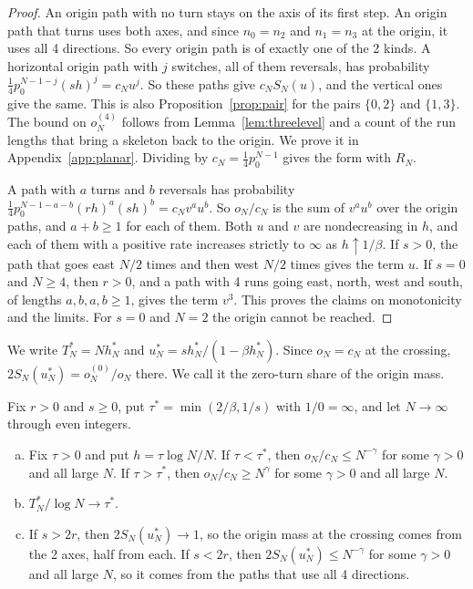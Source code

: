 \begin{proof}
An origin path with no turn stays on the axis of its first step. An origin path that turns uses both
axes, and since $n_0=n_2$ and $n_1=n_3$ at the origin, it uses all 4 directions. So every origin
path is of exactly one of the 2 kinds. A horizontal origin
path with $j$ switches, all of them reversals, has probability $\frac14p_0^{N-1-j}(sh)^j=c_Nu^j$.
So these paths give $c_NS_N(u)$, and the vertical ones give the same. This is also
Proposition~\ref{prop:pair} for the pairs $\{0,2\}$ and $\{1,3\}$. The bound on $o^{(4)}_N$ follows
from Lemma~\ref{lem:threelevel} and a count of the run lengths that bring a skeleton back to the
origin. We prove it in Appendix~\ref{app:planar}. Dividing by $c_N=\frac14p_0^{N-1}$ gives the form
with $R_N$.

A path with $a$ turns and $b$ reversals has probability $\frac14p_0^{N-1-a-b}(rh)^a(sh)^b=c_Nv^au^b$.
So $o_N/c_N$ is the sum of $v^au^b$ over the origin paths, and $a+b\ge1$ for each of them. Both $u$
and $v$ are nondecreasing in $h$, and each of them with a positive rate increases strictly to
$\infty$ as $h\uparrow1/\beta$. If $s>0$, the path that goes east $N/2$ times and then west $N/2$
times gives the term $u$. If $s=0$ and $N\ge4$, then $r>0$, and a path with 4 runs going east,
north, west and south, of lengths $a,b,a,b\ge1$, gives the term $v^3$. This proves the claims on
monotonicity and the limits. For $s=0$ and $N=2$ the origin cannot be reached.
\end{proof}

We write $T^*_N=Nh^*_N$ and $u^*_N=sh^*_N/(1-\beta h^*_N)$. Since $o_N=c_N$ at the crossing,
$2S_N(u^*_N)=o^{(0)}_N/o_N$ there. We call it the zero-turn share of the origin mass.

\begin{theorem}\label{thm:planar-first}
Fix $r>0$ and $s\ge0$, put $\tau^*=\min(2/\beta,1/s)$ with $1/0=\infty$, and let $N\to\infty$
through even integers.
\begin{enumerate}[(a)]
\item Fix $\tau>0$ and put $h=\tau\log N/N$. If $\tau<\tau^*$, then $o_N/c_N\le N^{-\gamma}$ for
some $\gamma>0$ and all large $N$. If $\tau>\tau^*$, then $o_N/c_N\ge N^{\gamma}$ for some
$\gamma>0$ and all large $N$.
\item $T^*_N/\log N\to\tau^*$.
\item If $s>2r$, then $2S_N(u^*_N)\to1$, so the origin mass at the crossing comes from the 2 axes,
half from each. If $s<2r$, then $2S_N(u^*_N)\le N^{-\gamma}$ for some $\gamma>0$ and all large $N$,
so it comes from the paths that use all 4 directions.
\end{enumerate}
\end{theorem}

